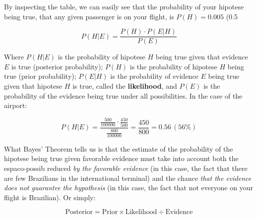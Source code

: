 \documentclass[./main_en.tex]{subfiles}
\begin{document}
By inspecting the table, we can easily see that the probability of your \gls{hipotese} being true, that any given passenger is on your flight, is $P(H) = 0.005$ (0.5%
\begin{linenomath*}
\begin{equation}
\label{eq:bayes}
    P(H | E) = \frac{P(H) \cdot P(E | H)}{P(E)}
\end{equation}
\end{linenomath*}
Where $P(H | E)$ is the probability of \gls{hipotese} $H$ being true given that evidence $E$ is true (posterior probability); $P(H)$ is the probability of \gls{hipotese} $H$ being true (prior probability); $P(E | H)$ is the probability of evidence $E$ being true given that \gls{hipotese} $H$ is true, called the \textbf{\gls{likelihood}}, and $P(E)$ is the probability of the evidence being true under all possibilities. In the case of the airport:
\begin{linenomath*}
\begin{equation*}
    P(H | E) = \frac{\frac{500}{100000} \cdot \frac{450}{500}}{\frac{800}{100000}} = \frac{450}{800} = 0.56\,(56\%)
\end{equation*}
\end{linenomath*}
What Bayes' Theorem tells us is that the estimate of the probability of the \gls{hipotese} being true given favorable evidence must take into account both the \gls{espaco-possib} reduced \textit{by the favorable evidence} (in this case, the fact that there are few Brazilians in the international terminal) and the chance \textit{that the evidence does not guarantee the hypothesis} (in this case, the fact that not everyone on your flight is Brazilian). Or simply:
\begin{linenomath*}
\begin{equation*}
    \text{Posterior} = \text{Prior} \times \text{Likelihood} \div \text{Evidence}
\end{equation*}
\end{linenomath*}
\end{document}
